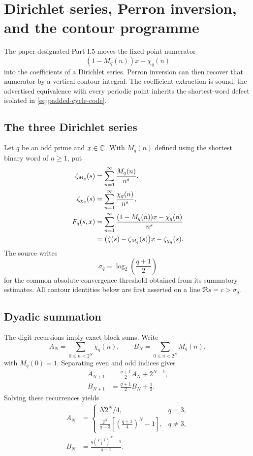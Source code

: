 \section{Dirichlet series, Perron inversion, and the contour programme}
\label{sec:contour-mellin}

The paper designated Part I.5 moves the fixed-point numerator
\[
 (1-M_q(n))x-\chi_q(n)
\]
into the coefficients of a Dirichlet series.  Perron inversion can then
recover that numerator by a vertical contour integral.  The coefficient
extraction is sound; the advertised equivalence with every periodic point
inherits the shortest-word defect isolated in
\cref{eq:padded-cycle-code}.

\subsection{The three Dirichlet series}

Let $q$ be an odd prime and $x\in\mathbb C$.  With $M_q(n)$ defined using the
shortest binary word of $n\geq1$, put
\begin{align}
 \zeta_{M_q}(s)&=\sum_{n=1}^{\infty}\frac{M_q(n)}{n^s},
 \label{eq:zeta-Mq}\\
 \zeta_{\chi_q}(s)&=\sum_{n=1}^{\infty}\frac{\chi_q(n)}{n^s},
 \label{eq:zeta-chiq}\\
 F_q(s,x)&=\sum_{n=1}^{\infty}
 \frac{(1-M_q(n))x-\chi_q(n)}{n^s}\notag\\
 &=\bigl(\zeta(s)-\zeta_{M_q}(s)\bigr)x-
   \zeta_{\chi_q}(s).
 \label{eq:Fq}
\end{align}
The source writes
\begin{equation}
\label{eq:sigma-q}
 \sigma_q=\log_2\left(\frac{q+1}{2}\right)
\end{equation}
for the common absolute-convergence threshold obtained from its summatory
estimates.  All contour identities below are first asserted on a line
$\Re s=c>\sigma_q$.

\subsection{Dyadic summation}

The digit recursions imply exact block sums.  Write
\[
 A_N=\sum_{0\leq n<2^N}\chi_q(n),
 \qquad
 B_N=\sum_{0\leq n<2^N}M_q(n),
\]
with $M_q(0)=1$.  Separating even and odd indices gives
\begin{align}
 A_{N+1}&=\frac{q+1}{2}A_N+2^{N-1},\label{eq:A-recurrence}\\
 B_{N+1}&=\frac{q+1}{2}B_N+\frac12.
 \label{eq:B-recurrence}
\end{align}
Solving these recurrences yields
\begin{align}
 A_N&=
 \begin{cases}
 N2^N/4,&q=3,\\[2mm]
 \displaystyle\frac{2^N}{q-3}
 \left[\left(\frac{q+1}{4}\right)^N-1\right],&q\ne3,
 \end{cases}
 \label{eq:chi-block-sum}\\
 B_N&=\frac{q\left(\frac{q+1}{2}\right)^N-1}{q-1}.
 \label{eq:M-block-sum}
\end{align}

